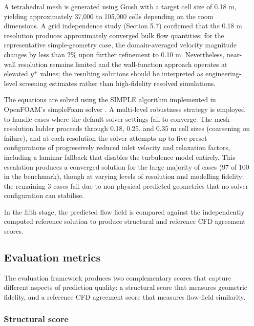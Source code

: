\documentclass[preprint,12pt,number]{elsarticle}
\begin{document}
A tetrahedral mesh is generated using Gmsh \cite{geuzaine.remacle2009Gmsh3D} with a target cell size of 0.18 m, yielding approximately 37,000 to 105,000 cells depending on the room dimensions. A grid independence study (Section 5.7) confirmed that the 0.18 m resolution produces approximately converged bulk flow quantities: for the representative simple-geometry case, the domain-averaged velocity magnitude changes by less than 2\% upon further refinement to 0.10 m. Nevertheless, near-wall resolution remains limited and the wall-function approach operates at elevated $y^+$ values; the resulting solutions should be interpreted as engineering-level screening estimates rather than high-fidelity resolved simulations.

The equations are solved using the SIMPLE algorithm \cite{patankar.spalding1972CalculationProcedure} implemented in OpenFOAM's simpleFoam solver \cite{weller.etal1998TensorialApproach}. A multi-level robustness strategy is employed to handle cases where the default solver settings fail to converge. The mesh resolution ladder proceeds through 0.18, 0.25, and 0.35 m cell sizes (coarsening on failure), and at each resolution the solver attempts up to five preset configurations of progressively reduced inlet velocity and relaxation factors, including a laminar fallback that disables the turbulence model entirely. This escalation produces a converged solution for the large majority of cases (97 of 100 in the benchmark), though at varying levels of resolution and modelling fidelity; the remaining 3 cases fail due to non-physical predicted geometries that no solver configuration can stabilise.

In the fifth stage, the predicted flow field is compared against the independently computed reference solution to produce structural and reference CFD agreement scores.

\subsection{Evaluation metrics}
\label{sec:evaluation-metrics}


The evaluation framework produces two complementary scores that capture different aspects of prediction quality: a structural score that measures geometric fidelity, and a reference CFD agreement score that measures flow-field similarity.

\subsubsection{Structural score}
\end{document}
